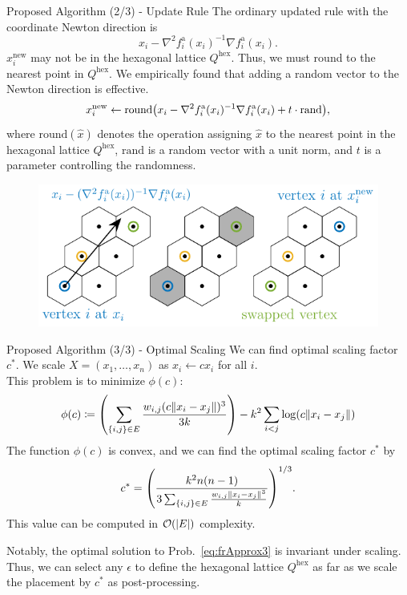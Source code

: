 \documentclass[dvipdfmx,13pt,aspectratio=169]{beamer}
\newcommand{\defeq}{\coloneqq}
\newif\ifShowHidden
\begin{document}
\begin{frame}{Proposed Algorithm (2/3) - Update Rule}
  The ordinary updated rule with the coordinate Newton direction is
  \begin{equation*}
    x_i - \nabla^2 f^{\mathrm{a}}_i(x_i)^{-1} \nabla f^{\mathrm{a}}_i(x_i).
  \end{equation*}
  $x_i^\mathrm{new}$ may not be in the hexagonal lattice $Q^\mathrm{hex}$.
  Thus, we must round to the nearest point in $Q^\mathrm{hex}$.
  We empirically found that adding a random vector to the Newton direction is effective.
  \begin{equation*}
    x_i^\mathrm{new} \gets \mathrm{round}\qty(x_i - \nabla^2 f^{\mathrm{a}}_i(x_i)^{-1} \nabla f^{\mathrm{a}}_i(x_i) + t \cdot \text{rand}),
  \end{equation*}
  where $\mathrm{round}(\hat{x})$ denotes the operation assigning $\hat{x}$ to the nearest point in the hexagonal lattice $Q^\mathrm{hex}$, $\mathrm{rand}$ is a random vector with a unit norm, and $t$ is a parameter controlling the randomness.

  \begin{figure}[t]
    \centering
    \includegraphics[width=0.5\columnwidth]{../main/hex/hex.pdf}
    \label{fig:hex}
  \end{figure}
\end{frame}

\begin{frame}{Proposed Algorithm (3/3) - Optimal Scaling}
  We can find optimal scaling factor $c^*$.
  We scale $X = (x_1, \dots, x_n)$ as $x_i \gets c x_i$ for all $i$.\\
  This problem is to minimize $\phi(c)$:
  \begin{equation*}
    \phi(c) \defeq \qty(\sum_{\{i,j\} \in E} \frac{w_{i,j} (c \norm{x_i - x_j})^3}{3k}) - k^2 \sum_{i < j} \log(c \norm{x_i - x_j})
  \end{equation*}
  The function $\phi(c)$ is convex, and we can find the optimal scaling factor $c^*$ by
  \begin{equation}\label{eq:scaling}
    c^* = \qty(\frac{k^2 n(n-1)}{3 \sum_{\{i,j\} \in E} \frac{w_{i,j} \norm{x_i - x_j}^3}{k}})^{1/3}.
  \end{equation}
  This value can be computed in $\order{\abs{E}}$ complexity.

  Notably, the optimal solution to Prob.~\eqref{eq:frApprox3} is invariant under scaling. Thus, we can select any $\epsilon$ to define the hexagonal lattice $Q^\mathrm{hex}$ as far as we scale the placement by $c^*$ as post-processing.
\end{frame}
\end{document}
